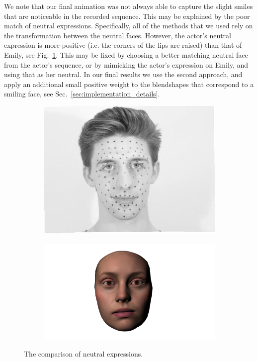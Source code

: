 We note that our final animation was not always able to capture the slight smiles that are noticeable in the recorded sequence. This may be explained by the poor match of neutral expressions. Specifically, all of the methods that we used rely on the transformation between the neutral faces. However, the actor's neutral expression is more positive (i.e. the corners of the lips are raised) than that of Emily, see Fig.~\ref{fig:neutrals}. This may be fixed by choosing a better matching neutral face from the actor's sequence, or by mimicking the actor's expression on Emily, and using that as her neutral. In our final results we use the second approach, and apply an additional small positive weight to the blendshapes that correspond to a smiling face, see Sec.~\ref{sec:implementation_details}.
\begin{figure}
        \centering
        \begin{subfigure}[b]{0.3\textwidth}
                \includegraphics[width=\textwidth]{img/Richard2neutral}
        \end{subfigure}
        \begin{subfigure}[b]{0.4\textwidth}
                \includegraphics[width=\textwidth]{img/emily_neutral}
        \end{subfigure}
        \caption{The comparison of neutral expressions.}\label{fig:neutrals}
\end{figure}

